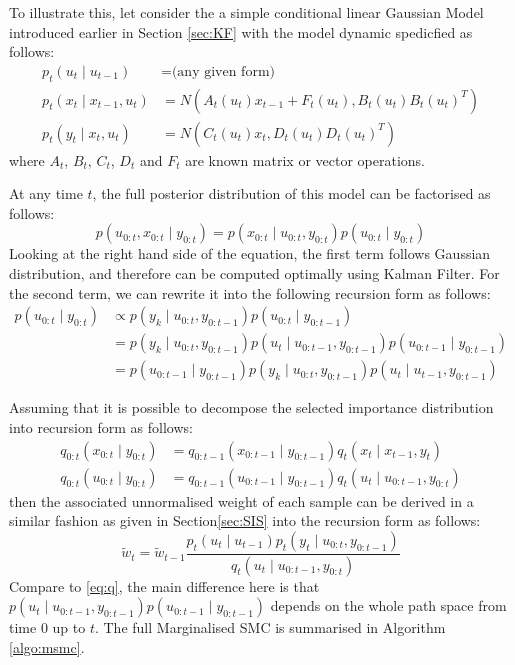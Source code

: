 To illustrate this, let consider the a simple conditional linear Gaussian Model introduced earlier in Section \ref{sec:KF} with the model dynamic spedicfied as follows:
\begin{align}
  p_t(u_t \mid u_{t-1}) &= \textrm{(any given form)} \\
  p_t(x_t \mid x_{t-1}, u_t) &= N(A_t(u_t) x_{t-1} + F_t(u_t), B_t(u_t)B_t(u_t)^T) \nonumber \\
  p_t(y_t \mid x_t, u_t)    &= N(C_t(u_t) x_t, D_t(u_t)D_t(u_t)^T)
\end{align}
where $A_t$, $B_t$, $C_t$, $D_t$ and $F_t$ are known matrix or vector operations.

At any time $t$, the full posterior distribution of this model can be factorised as follows:
\begin{equation}
  p(u_{0:t}, x_{0:t} \mid y_{0:t}) = p(x_{0:t} \mid u_{0:t}, y_{0:t}) p(u_{0:t} \mid y_{0:t})
\end{equation}
Looking at the right hand side of the equation, the first term follows Gaussian distribution, and therefore can be computed optimally using Kalman Filter. For the second term, we can rewrite it into the following recursion form as follows:
\begin{align}
p(u_{0:t} \mid y_{0:t}) &\propto p(y_k \mid u_{0:t}, y_{0:t-1}) p(u_{0:t} \mid y_{0:t-1}) \nonumber \\
&=  p(y_k \mid u_{0:t}, y_{0:t-1}) p(u_t \mid u_{0:t-1}, y_{0:t-1}) p(u_{0:t-1} \mid y_{0:t-1}) \nonumber \\
&=  p(u_{0:t-1} \mid y_{0:t-1}) p(y_k \mid u_{0:t}, y_{0:t-1}) p(u_t \mid u_{t-1}, y_{0:t-1}) 
\end{align}

Assuming that it is possible to decompose the selected importance distribution into recursion form as follows:
\begin{align}
	q_{0:t}(x_{0:t} \mid y_{0:t}) &= q_{0:t-1}(x_{0:t-1} \mid y_{0:t-1}) q_t(x_t \mid x_{t-1}, y_t) \nonumber \\
	q_{0:t}(u_{0:t} \mid y_{0:t}) &= q_{0:t-1}(u_{0:t-1} \mid y_{0:t-1}) q_t(u_t \mid u_{0:t-1}, y_{0:t}) 
\label{eq:q2}
\end{align}
then the associated unnormalised weight of each sample can be derived in a similar fashion as given in Section\ref{sec:SIS} into the recursion form as follows:
\begin{equation}
   \tilde{w}_t  = \tilde{w}_{t-1} \dfrac{p_t(u_t \mid u_{t-1})p_t(y_t \mid u_{0:t}, y_{0:t-1})}{q_t(u_t \mid u_{0:t-1}, y_{0:t})}
   \label{eq:wsmsc}
\end{equation}
Compare to \eqref{eq:q}, the main difference here is that $p(u_t \mid u_{0:t-1}, y_{0:t-1}) p(u_{0:t-1} \mid y_{0:t-1})$ depends on the whole path space from time $0$ up to $t$. The full Marginalised SMC is summarised in Algorithm \ref{algo:msmc}.

